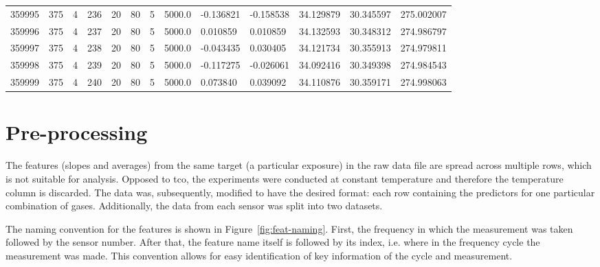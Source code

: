 \begin{table}
{\begin{tabular}{p{1.5cm}p{1.3cm}p{0.8cm}p{1.3cm}p{0.8cm}p{0.8cm}p{1.8cm}p{1.8cm}p{1.8cm}p{1.8cm}p{1.8cm}p{1.8cm}p{1.8cm}}
		359995 &          375 &         4 &        236 &        20 &         80 &          5 &     5000.0 &              -0.136821 &              -0.158538 &                34.129879 &                30.345597 &              275.002007 \\
		359996 &          375 &         4 &        237 &        20 &         80 &          5 &     5000.0 &               0.010859 &               0.010859 &                34.132593 &                30.348312 &              274.986797 \\
		359997 &          375 &         4 &        238 &        20 &         80 &          5 &     5000.0 &              -0.043435 &               0.030405 &                34.121734 &                30.355913 &              274.979811 \\
		359998 &          375 &         4 &        239 &        20 &         80 &          5 &     5000.0 &              -0.117275 &              -0.026061 &                34.092416 &                30.349398 &              274.984543 \\
		359999 &          375 &         4 &        240 &        20 &         80 &          5 &     5000.0 &               0.073840 &               0.039092 &                34.110876 &                30.359171 &              274.998063 \\
		\bottomrule[0.5mm]
	\end{tabular}}
\end{table}

\newpage
\section{Pre-processing}
\label{sec:preprocessing}

The features (slopes and averages) from the same target (a particular exposure) in the raw data file  are spread across multiple rows, which is not suitable for analysis. Opposed to \acrshort{tco}, the experiments were conducted at constant temperature and therefore the temperature column is discarded. The data was, subsequently, modified to have the desired format: each row containing the predictors for one particular combination of gases. Additionally, the data from each sensor was split into  two datasets. 

The naming convention for the features is shown in Figure~\ref{fig:feat-naming}. First, the frequency in which the measurement was taken followed by the sensor number. After that, the feature name itself is followed by its index, i.e. where in the frequency cycle the measurement was made. This convention allows for easy identification of key information of the cycle and measurement.

